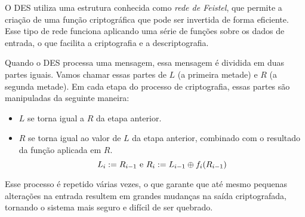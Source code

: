 O DES utiliza uma estrutura conhecida como {\em rede de Feistel}, que permite a criação de uma função criptográfica que pode ser invertida de forma eficiente.
Esse tipo de rede funciona aplicando uma série de funções sobre os dados de entrada, o que facilita a criptografia e a descriptografia.

Quando o DES processa uma mensagem, essa mensagem é dividida em duas partes iguais.
Vamos chamar essas partes de $L$ (a primeira metade) e $R$ (a segunda metade).
Em cada etapa do processo de criptografia, essas partes são manipuladas da seguinte maneira:
\begin{itemize}
\item[] $L$ se torna igual a $R$ da etapa anterior.
\item[] $R$ se torna igual ao valor de $L$ da etapa anterior, combinado com o resultado da função aplicada em $R$.
  \begin{displaymath}
    L_i := R_{i-1} \textrm{ e } R_i := L_{i-1} \oplus f_i(R_{i-1})
  \end{displaymath}
\end{itemize}

Esse processo é repetido várias vezes, o que garante que até mesmo pequenas alterações na entrada resultem em grandes mudanças na saída criptografada, tornando o sistema mais seguro e difícil de ser quebrado.


\begin{center}
\end{center}

